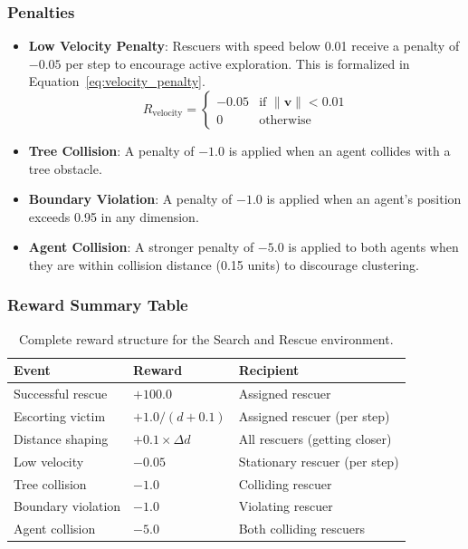 \documentclass[11pt,a4paper]{article}
\begin{document}
\subsubsection{Penalties}
\label{subsubsec:penalties}

\begin{itemize}
    \item \textbf{Low Velocity Penalty}: Rescuers with speed below 0.01 receive a penalty of $-0.05$ per step to encourage active exploration.
    This is formalized in Equation~\ref{eq:velocity_penalty}.
    \begin{equation}
    \label{eq:velocity_penalty}
    R_{\text{velocity}} = \begin{cases}
        -0.05 & \text{if } \|\mathbf{v}\| < 0.01 \\
        0 & \text{otherwise}
    \end{cases}
    \end{equation}

    \item \textbf{Tree Collision}: A penalty of $-1.0$ is applied when an agent collides with a tree obstacle.

    \item \textbf{Boundary Violation}: A penalty of $-1.0$ is applied when an agent's position exceeds 0.95 in any dimension.

    \item \textbf{Agent Collision}: A stronger penalty of $-5.0$ is applied to both agents when they are within collision distance (0.15 units) to discourage clustering.
\end{itemize}

\subsubsection{Reward Summary Table}
\label{subsubsec:reward_table}

\begin{table}[H]
\centering
\begin{tabular}{lll}
\toprule
\textbf{Event} & \textbf{Reward} & \textbf{Recipient} \\
\midrule
Successful rescue & $+100.0$ & Assigned rescuer \\
Escorting victim & $+1.0 / (d + 0.1)$ & Assigned rescuer (per step) \\
Distance shaping & $+0.1 \times \Delta d$ & All rescuers (getting closer) \\
Low velocity & $-0.05$ & Stationary rescuer (per step) \\
Tree collision & $-1.0$ & Colliding rescuer \\
Boundary violation & $-1.0$ & Violating rescuer \\
Agent collision & $-5.0$ & Both colliding rescuers \\
\bottomrule
\end{tabular}
\caption{Complete reward structure for the Search and Rescue environment.}
\label{tab:rewards}
\end{table}
\end{document}
